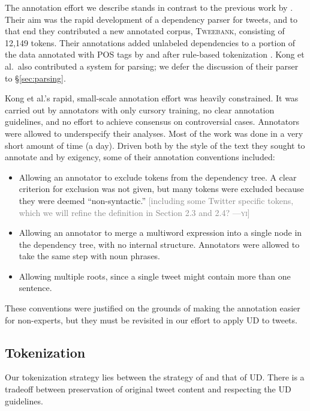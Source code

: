 \documentclass[11pt,a4paper]{article}
\newcommand{\yicomment}[1]{\textcolor{gray}{[#1 ---\textsc{yi}]}}
\begin{document}
The annotation effort we describe stands in contrast to the previous work
by .  Their aim was the rapid
development of a dependency parser for tweets, and to that end they
contributed a new annotated corpus, \textsc{Tweebank}, consisting of
12,149 tokens.  Their annotations added unlabeled dependencies to a portion of the data
annotated with POS tags by 
 and
 after rule-based tokenization \citep{ICWSM101540}.
Kong et al.~also contributed a system for parsing;
we defer the discussion of their parser to \S\ref{sec:parsing}.

Kong et al.'s rapid, small-scale annotation effort was heavily constrained.  It was
carried out by annotators with only cursory training, no clear
annotation guidelines, and no effort to achieve consensus on controversial
cases. Annotators were allowed to underspecify their analyses.
Most of the work was done in a very short amount of
time (a day).  Driven both by the style of the text they sought to annotate
and by exigency, some of their annotation conventions included:
\begin{itemize}
\item Allowing an annotator to exclude tokens from the dependency
  tree.  A clear criterion for exclusion was not given, but many
  tokens were excluded because they were deemed ``non-syntactic.'' \yicomment{including some Twitter specific tokens, which we will refine the definition in Section 2.3 and 2.4?}
\item Allowing an annotator to merge a multiword expression into a
  single node in the dependency tree, with no internal structure.
  Annotators were allowed to take the same step with noun phrases.
\item Allowing multiple roots, since a single tweet might contain more
  than one sentence.
\end{itemize}
These conventions were justified on the grounds of making the
annotation easier for non-experts, but they must be revisited in our
effort to apply UD to tweets.

\subsection{Tokenization}\label{sec:tok-anno}
Our tokenization strategy lies between the strategy of
\citet{ICWSM101540} and that of UD.
There is a tradeoff between preservation of original tweet content and respecting
the UD guidelines.
\end{document}
